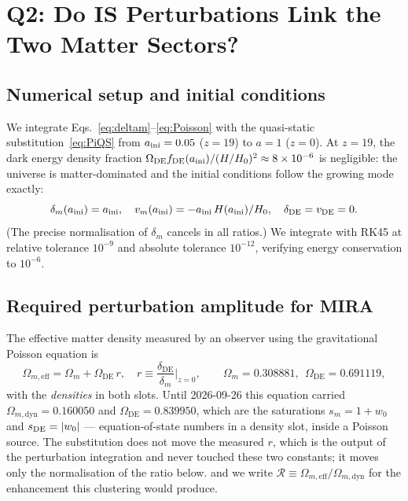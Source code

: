 \documentclass[12pt,a4paper]{article}
\newcommand{\OmDE}{\Omega_{\mathrm{DE}}}
\begin{document}
\section{Q2: Do IS Perturbations Link the Two Matter Sectors?}
\label{sec:Q2_MIRA}

\subsection{Numerical setup and initial conditions}
\label{subsec:setup}

We integrate Eqs.~\eqref{eq:deltam}--\eqref{eq:Poisson} with the quasi-static
substitution~\eqref{eq:PiQS} from $a_{\rm ini}=0.05$ ($z=19$) to $a=1$ ($z=0$).
At $z=19$, the dark energy density fraction $\OmDE f_{\mathrm{DE}}(a_{\rm ini})/(H/H_0)^2 \approx 8\times10^{-6}$
is negligible: the universe is matter-dominated and the initial conditions
follow the growing mode exactly:
\begin{equation}
  \delta_m(a_{\rm ini}) = a_{\rm ini}, \quad
  v_m(a_{\rm ini}) = -a_{\rm ini}\,H(a_{\rm ini})/H_0, \quad
  \delta_{\mathrm{DE}} = v_{\mathrm{DE}} = 0.
  \label{eq:IC}
\end{equation}
(The precise normalisation of $\delta_m$ cancels in all ratios.)
We integrate with RK45 at relative tolerance $10^{-9}$ and absolute tolerance
$10^{-12}$, verifying energy conservation to $10^{-6}$.

\subsection{Required perturbation amplitude for MIRA}
\label{subsec:MIRA_requirement}

The effective matter density measured by an observer using the gravitational
Poisson equation is
\begin{equation}
  \Omega_{m,\mathrm{eff}} = \Omega_m + \Omega_{\mathrm{DE}}\,r,
  \quad r \equiv \frac{\delta_{\mathrm{DE}}}{\delta_m}\bigg|_{z=0},
  \qquad \Omega_m = 0.308881,\ \ \Omega_{\mathrm{DE}} = 0.691119,
  \label{eq:Omeff}
\end{equation}
with the \emph{densities} in both slots. Until 2026-09-26 this equation carried
$\Omega_{m,\mathrm{dyn}}=0.160050$ and $\Omega_{\mathrm{DE}}=0.839950$, which are the
saturations $s_m=1+w_0$ and $s_{\rm DE}=|w_0|$ --- equation-of-state numbers in a
density slot, inside a Poisson source. The substitution does not move the
measured $r$, which is the output of the perturbation integration and never
touched these two constants; it moves only the normalisation of the ratio below.
and we write $\mathcal{R} \equiv \Omega_{m,\mathrm{eff}}/\Omega_{m,\mathrm{dyn}}$ for the
enhancement this clustering would produce.
\end{document}
